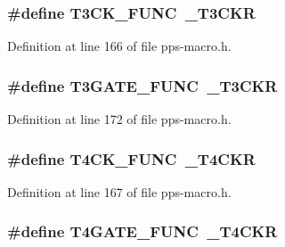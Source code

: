 \subsubsection[{T3\+C\+K\+\_\+\+F\+U\+N\+C}]{\setlength{\rightskip}{0pt plus 5cm}\#define T3\+C\+K\+\_\+\+F\+U\+N\+C~\+\_\+\+T3\+C\+K\+R}\label{pps-macro_8h_a14b73712963fec1b549b2bb2a7346f88}


Definition at line 166 of file pps-\/macro.\+h.

\hypertarget{pps-macro_8h_ac6006c72b254e0e1c31c4c9bf5fd92d4}{}
\subsubsection[{T3\+G\+A\+T\+E\+\_\+\+F\+U\+N\+C}]{\setlength{\rightskip}{0pt plus 5cm}\#define T3\+G\+A\+T\+E\+\_\+\+F\+U\+N\+C~\+\_\+\+T3\+C\+K\+R}\label{pps-macro_8h_ac6006c72b254e0e1c31c4c9bf5fd92d4}


Definition at line 172 of file pps-\/macro.\+h.

\hypertarget{pps-macro_8h_a257546c53b00a2e9fafa2b5ba36057e9}{}
\subsubsection[{T4\+C\+K\+\_\+\+F\+U\+N\+C}]{\setlength{\rightskip}{0pt plus 5cm}\#define T4\+C\+K\+\_\+\+F\+U\+N\+C~\+\_\+\+T4\+C\+K\+R}\label{pps-macro_8h_a257546c53b00a2e9fafa2b5ba36057e9}


Definition at line 167 of file pps-\/macro.\+h.

\hypertarget{pps-macro_8h_a0ac018197af0d92fb338044b0827e374}{}
\subsubsection[{T4\+G\+A\+T\+E\+\_\+\+F\+U\+N\+C}]{\setlength{\rightskip}{0pt plus 5cm}\#define T4\+G\+A\+T\+E\+\_\+\+F\+U\+N\+C~\+\_\+\+T4\+C\+K\+R}\label{pps-macro_8h_a0ac018197af0d92fb338044b0827e374}


